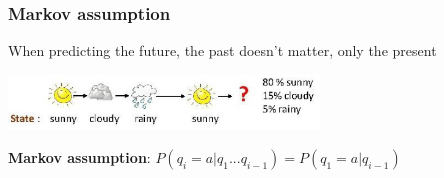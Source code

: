 \documentclass[13.5pt,aspecratio=169]{beamer}
\begin{document}


\begin{frame}
\onehalfspacing
	\frametitle{Markov assumption}
    {\large When predicting the future, the past doesn’t matter, only the present} \vspace{2em}

    \includegraphics[width=0.62\textwidth]{Rain_Prediction.png}

    \begin{center}
        \textbf{Markov assumption}: \hspace{1em} $P(q_i = a | q_1 ... q_{i-1}) = P(q_1 = a | q_{i-1})$
    \end{center}
\end{frame}
\end{document}
